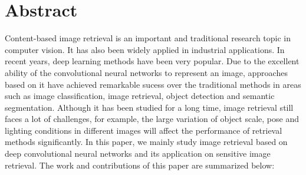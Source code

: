 
\chapter*{Abstract}
Content-based image retrieval is an important and traditional research topic in computer vision. It has also been widely applied in industrial applications. In recent years, deep learning methods have been very popular. Due to the excellent ability of the convolutional neural networks to represent an image, approaches based on it have achieved remarkable sucess over the traditional methods in areas such as image classification, image retrieval, object detection and semantic segmentation. Although it has been studied for a long time, image retrieval still faces a lot of challenges, for example, the large variation of object scale, pose and lighting conditions in different images will affect the performance of retrieval methods significantly. In this paper, we mainly study image retrieval based on deep convolutional neural networks and its application on sensitive image retrieval. The work and contributions of this paper are summarized below:

